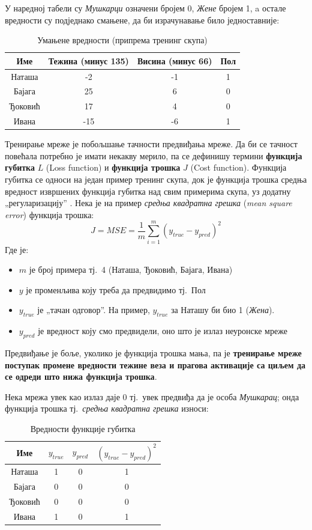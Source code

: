 \documentclass[12pt, а4paper]{article}
\begin{document}
У наредној табели су \textit{Мушкарци} означени бројем 0, \textit{Жене} бројем 1, a
остале вредности су подједнако смањене, да би израчунавање било једноставније:

\begin{table}[ht]
\centering
 \begin{tabular}{| c | c | c | c |}
  \hline
  Име & Тежина (минус 135) & Висина (минус 66) & Пол \\
  \hline
  Наташа & -2 & -1 & 1\\
  Бајага & 25 & 6 & 0\\
  Ђоковић & 17 & 4 & 0\\
  Ивана & -15 & -6 & 1\\
  \hline
 \end{tabular}
 \caption{Умањене вредности (припрема тренинг скупа)}
\end{table}


Тренирање мреже је побољшање тачности предвиђања мреже. Да би се тачност повећала потребно
је имати некакву мерило, па се
дефинишу термини \textbf{функција губитка} $L$ (Loss function) и
\textbf{функција трошка} $J$ (Cost function). Функција губитка се односи на један пример тренинг
скупа, док је функција трошка средња вредност извршених функција губитка над свим
примерима скупа, уз додатну „регуларизацију” \cite{stackex_loss}.
\newpage
Нека је на пример \textit{средња квадратна грешка} (\textit{mean square error}) функција трошка:
\begin{equation}
J = MSE = \frac{1}{m} \sum_{i=1}^{m} (y_{true} - y_{pred})^2
\end{equation}
Где је:
\begin{itemize}
 \item $m$ је број примера тј.\ 4 (Наташа, Ђоковић, Бајага, Ивана)
 \item $y$ је променљива коју треба да предвидимо тј.\ Пол
 \item $y_{true}$ је „тачан одговор”. На пример, $y_{true}$ за Наташу би био 1 (\textit{Жена}).
 \item $y_{pred}$ је вредност коју смо предвидели, оно што је излаз неуронске мреже
\end{itemize}

Предвиђање је боље, уколико је функција трошка мања, па је
\textbf{тренирање мреже поступак промене вредности тежине веза и
прагова активације са циљем да се одреди што нижа функција трошка}.

Нека мрежа увек као излаз даје $0$ тј.\ увек предвиђа да је особа \textit{Мушкарац};
онда функција трошка тј.\ \textit{средња квадратна грешка} износи:
\begin{table}[ht]
\centering
 \begin{tabular}{| c | c | c | c |}
  \hline
  Име & $y_{true}$ & $y_{pred}$ & $(y_{true} - y_{pred})^2$ \\
  \hline
  Наташа & 1 & 0 & 1\\
  Бајага & 0 & 0 & 0\\
  Ђоковић & 0 & 0 & 0\\
  Ивана & 1 & 0 & 1\\
  \hline
 \end{tabular}
 \caption{Вредности функције губитка}
 \label{tab:primerSkupa}
\end{table}
\end{document}
